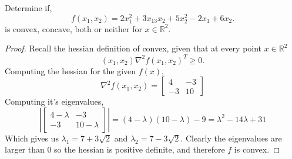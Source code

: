 \documentclass[12pt]{article}
\makeatletter
\theoremstyle{homework}
\newenvironment{exercise}[1]
{\def\@currentlabel{#1}\exercisecore}
{\endexercisecore}
\newcommand{\Reals}{\ensuremath{\mathbb R}}
\let\RR\Reals
\makeatother
\begin{document}
\begin{exercise}{3.20} Determine if, 
  \begin{equation*}
    f(x_1, x_2) = 2x_1^2 + 3x_13x_2 + 5x_2^2 - 2x_1 + 6x_2. 
  \end{equation*}
  is convex, concave, both or neither for $x \in \RR^2$. 
    \begin{proof} Recall the hessian definition of convex, given that at every point $x \in \RR^2$
      \begin{equation*}
        (x_1, x_2)\nabla^2f(x_1,x_2)^T \geq 0.
      \end{equation*}
      Computing the hessian for the given $f(x)$, 
      \begin{equation*}
        \nabla^2f(x_1,x_2) = \begin{bmatrix}
          4 & -3\\
          -3 & 10
        \end{bmatrix}
      \end{equation*}
      Computing it's eigenvalues, 
      \begin{equation*}
        \left|\begin{bmatrix}
          4 - \lambda & -3\\
          -3 & 10 - \lambda
        \end{bmatrix}\right| = (4 - \lambda)(10 - \lambda) - 9 = \lambda^2-14\lambda+31
      \end{equation*}
      Which gives us $\lambda_1 = 7 + 3\sqrt{2}$ and $\lambda_2 = 7 - 3\sqrt{2}$. Clearly the eigenvalues 
      are larger than 0 so the hessian is positive definite, and therefore $f$ is convex. 
    \end{proof}
\end{exercise}
\vspace{.5in}
\end{document}
